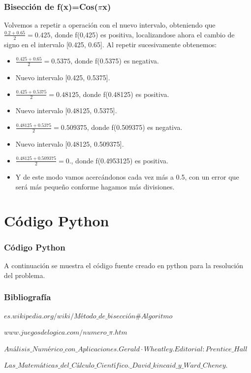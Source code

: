 \documentclass{beamer}
\begin{document}
\begin{frame}
\frametitle{Bisección de f(x)=Cos($\pi$x)}

\begin{block}{}
Volvemos a repetir a operación con el nuevo intervalo, obteniendo que $\frac{0.2+0.65}{2}=0.425$, donde f(0,425) es positiva, localizandose ahora el cambio de signo en el intervalo [0.425, 0.65]. Al repetir sucesivamente obtenemos:
\begin{itemize}

  \item $\frac{0.425+0.65}{2}=0.5375$, donde f(0.5375) es negativa.
  \pause
  \item Nuevo intervalo [0.425, 0.5375].
  \pause
  \item $\frac{0.425+0.5375}{2}=0.48125$, donde f(0.48125) es positiva.
  \pause
  \item Nuevo intervalo [0.48125, 0.5375].
  \pause
  \item $\frac{0.48125+0.5375}{2}=0.509375$, donde f(0.509375) es negativa.
  \pause
  \item Nuevo intervalo [0.48125, 0.509375].
  \pause
  \item $\frac{0.48125+0.509375}{2}=0.$, donde f(0.4953125) es positiva.
  \pause
  \item Y de este modo vamos acercándonos cada vez más a 0.5, con un error que será más pequeño conforme hagamos más divisiones.
\end{itemize}
\end{block}

\end{frame}

\section{Código Python}

\begin{frame}
\frametitle{Código Python}
A continuación se muestra el código fuente creado en python para la resolución del problema.

\end{frame}

\begin{frame}
\frametitle{Bibliografía}
\begin{thebibliography}
  \beamertermplatebookbibitems
  {\small $es.wikipedia.org/wiki/Método\_de\_bisección\#Algoritmo$}
  
  \beamertermplatebookbibitems
  {\small $www.juegosdelogica.com/numero\_\pi.htm$}
  
  \beamertermplatebookbibitems
  {\small $Análisis\_Numérico\_con\_Aplicaciones. Gerald·Wheatley. Editorial: Prentice\_Hall$}
  
  \beamertermplatebookbibitems
  {\small $Las\_Matemáticas\_del\_Cálculo\_Científico.\_David \_kincaid\_y\_Ward\_Cheney.$}
  
\end{thebibliography}
\end{frame}
\end{document}
